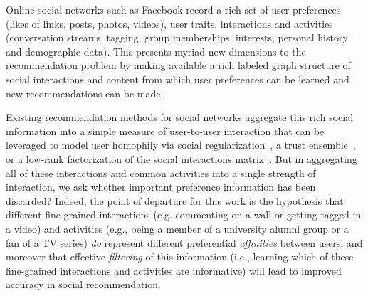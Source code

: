 
\label{sec:introduction}

Online social networks such as Facebook record a rich set of user
preferences (likes of links, posts, photos, videos), user traits,
interactions and activities (conversation streams, tagging, group
memberships, interests, personal history and demographic data).  This
presents myriad new dimensions to the recommendation problem by making
available a rich labeled graph structure of social interactions and
content from which user preferences can be learned and new
recommendations can be made.

Existing recommendation methods for social networks aggregate this
rich social information into a simple measure of user-to-user interaction 
that can be leveraged to model user homophily via social
regularization~\cite{lla,socinf,sr,rrmf, Noel2012NOF}, a trust
ensemble~\cite{ste}, or a low-rank factorization of the social
interactions matrix~\cite{sorec}.  But in aggregating all of these
interactions and common activities into a single strength of
interaction, we 
ask whether important preference information has been discarded?
Indeed, the point of departure for this work is the hypothesis that
different fine-grained interactions (e.g. commenting on a wall or
getting tagged in a video) and activities (e.g., being a member of a
university alumni group or a fan of a TV series) \emph{do} represent
different preferential {\em affinities} between users, and moreover
that effective {\em filtering} of this information (i.e., learning
which of these fine-grained interactions and activities are 
informative) will lead to improved accuracy in social recommendation.


